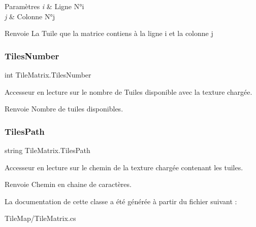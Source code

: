 \begin{DoxyParams}{Paramètres}
{\em i} & Ligne N°i \\
\hline
{\em j} & Colonne N°j \\
\hline
\end{DoxyParams}
\begin{DoxyReturn}{Renvoie}
La Tuile que la matrice contiens à la ligne i et la colonne j 
\end{DoxyReturn}
\mbox{\label{class_tile_matrix_a98329fd27bbbf07aa907efbd1b8a3822}} 
\subsubsection{\texorpdfstring{Tiles\+Number}{TilesNumber}}
{\footnotesize\ttfamily int Tile\+Matrix.\+Tiles\+Number\hspace{0.3cm}{\ttfamily [get]}}



Accesseur en lecture sur le nombre de Tuiles disponible avec la texture chargée. 

\begin{DoxyReturn}{Renvoie}
Nombre de tuiles disponibles. 
\end{DoxyReturn}
\mbox{\label{class_tile_matrix_aaff226a076c705b100bc8076ce3d025a}} 
\subsubsection{\texorpdfstring{Tiles\+Path}{TilesPath}}
{\footnotesize\ttfamily string Tile\+Matrix.\+Tiles\+Path\hspace{0.3cm}{\ttfamily [get]}}



Accesseur en lecture sur le chemin de la texture chargée contenant les tuiles. 

\begin{DoxyReturn}{Renvoie}
Chemin en chaine de caractères. 
\end{DoxyReturn}


La documentation de cette classe a été générée à partir du fichier suivant \+:\begin{DoxyCompactItemize}
\item 
Tile\+Map/Tile\+Matrix.\+cs\end{DoxyCompactItemize}
